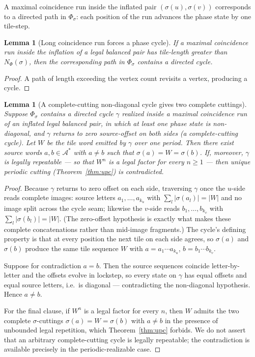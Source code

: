 \documentclass[11pt]{article}
\theoremstyle{plain}
\newtheorem{lemma}[theorem]{Lemma}
\theoremstyle{definition}
\theoremstyle{remark}
\newcommand{\A}{\mathcal{A}}
\begin{document}
A maximal coincidence run inside the inflated pair $(\sigma(u),\sigma(v))$ corresponds to a directed path in $\Phi_\sigma$: each position of the run advances the phase state by one tile-step.

\begin{lemma}[Long coincidence run forces a phase cycle]\label{lem:long-run-cycle}
If a maximal coincidence run inside the inflation of a legal balanced pair has tile-length greater than $N_\Phi(\sigma)$, then the corresponding path in $\Phi_\sigma$ contains a directed cycle.
\end{lemma}

\begin{proof}
A path of length exceeding the vertex count revisits a vertex, producing a cycle.
\end{proof}

\begin{lemma}[A complete-cutting non-diagonal cycle gives two complete cuttings]\label{lem:non-diag-cycle}
Suppose $\Phi_\sigma$ contains a directed cycle $\gamma$ realized inside a maximal coincidence run of an inflated legal balanced pair, in which at least one phase state is non-diagonal, \emph{and $\gamma$ returns to zero source-offset on both sides} (a complete-cutting cycle). Let $W$ be the tile word emitted by $\gamma$ over one period. Then there exist source words $a,b\in\A^*$ with $a\ne b$ such that $\sigma(a)=W=\sigma(b)$. If, moreover, $\gamma$ is legally repeatable --- so that $W^n$ is a legal factor for every $n\ge1$ --- then unique periodic cutting (Theorem~\ref{thm:upc}) is contradicted.
\end{lemma}

\begin{proof}
Because $\gamma$ returns to zero offset on each side, traversing $\gamma$ once the $u$-side reads complete images: source letters $a_1,\dots,a_{k_u}$ with $\sum_l|\sigma(a_l)|=|W|$ and no image split across the cycle seam; likewise the $v$-side reads $b_1,\dots,b_{k_v}$ with $\sum_l|\sigma(b_l)|=|W|$. (The zero-offset hypothesis is exactly what makes these complete concatenations rather than mid-image fragments.) The cycle's defining property is that at every position the next tile on each side agrees, so $\sigma(a)$ and $\sigma(b)$ produce the same tile sequence $W$ with $a=a_1\cdots a_{k_u}$, $b=b_1\cdots b_{k_v}$.

Suppose for contradiction $a=b$. Then the source sequences coincide letter-by-letter and the offsets evolve in lockstep, so every state on $\gamma$ has equal offsets and equal source letters, i.e.\ is diagonal --- contradicting the non-diagonal hypothesis. Hence $a\ne b$.

For the final clause, if $W^n$ is a legal factor for every $n$, then $W$ admits the two complete $\sigma$-cuttings $\sigma(a)=W=\sigma(b)$ with $a\ne b$ in the presence of unbounded legal repetition, which Theorem~\ref{thm:upc} forbids. We do not assert that an arbitrary complete-cutting cycle is legally repeatable; the contradiction is available precisely in the periodic-realizable case.
\end{proof}
\end{document}
